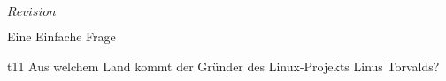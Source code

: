 \RCS $Revision$
\begin{aufgabe}{Eine Einfache Frage}
  \begin{teilaufgabe}[ohnenummer]{t}{1}{1}
      Aus welchem Land kommt der Gründer des Linux-Projekts Linus Torvalds?
  \end{teilaufgabe}
  \begin{loesung}
  \end{loesung}
\end{aufgabe}

